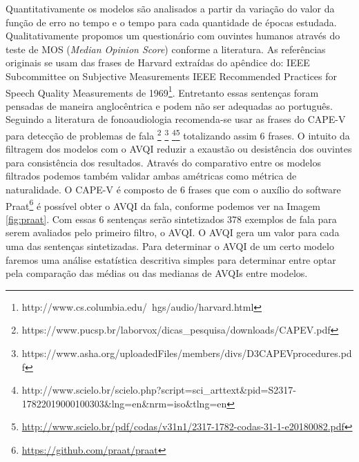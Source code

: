\documentclass{article}
\begin{document}
Quantitativamente os modelos são analisados a partir da variação do valor da função de erro no tempo e o tempo para cada quantidade de épocas estudada.
Qualitativamente propomos um questionário com ouvintes humanos através do teste de MOS (\textit{Median Opinion Score}) conforme a literatura. 
As referências originais se usam das frases de Harvard extraídas do apêndice do: IEEE Subcommittee on Subjective Measurements IEEE Recommended Practices for Speech Quality Measurements de 1969\footnote{http://www.cs.columbia.edu/~hgs/audio/harvard.html}.
Entretanto essas sentenças foram pensadas de maneira anglocêntrica e podem não ser adequadas ao português.
Seguindo a literatura de fonoaudiologia recomenda-se usar as frases do CAPE-V para detecção de problemas de fala \footnote{https://www.pucsp.br/laborvox/dicas\_pesquisa/downloads/CAPEV.pdf}  \footnote{https://www.asha.org/uploadedFiles/members/divs/D3CAPEVprocedures.pdf} \footnote{http://www.scielo.br/scielo.php?script=sci\_arttext\&pid=S2317-17822019000100303\&lng=en\&nrm=iso\&tlng=en}\footnote{\url{http://www.scielo.br/pdf/codas/v31n1/2317-1782-codas-31-1-e20180082.pdf}} totalizando assim 6 frases.
O intuito da filtragem dos modelos com o AVQI reduzir a exaustão ou desistência dos ouvintes para consistência dos resultados.
Através do comparativo entre os modelos filtrados podemos também validar ambas amétricas como métrica de naturalidade.
O CAPE-V é composto de 6 frases que com o auxílio do software Praat\footnote{\url{https://github.com/praat/praat}} é possível obter o AVQI da fala, conforme podemos ver na Imagem \ref{fig:praat}.
Com essas 6 sentenças serão sintetizados 378 exemplos de fala para serem avaliados pelo primeiro filtro, o AVQI.
O AVQI gera um valor para cada uma das sentenças sintetizadas.
Para determinar o AVQI de um certo modelo faremos uma análise estatística descritiva simples para determinar entre optar pela comparação das médias ou das medianas de AVQIs entre modelos.
\end{document}
